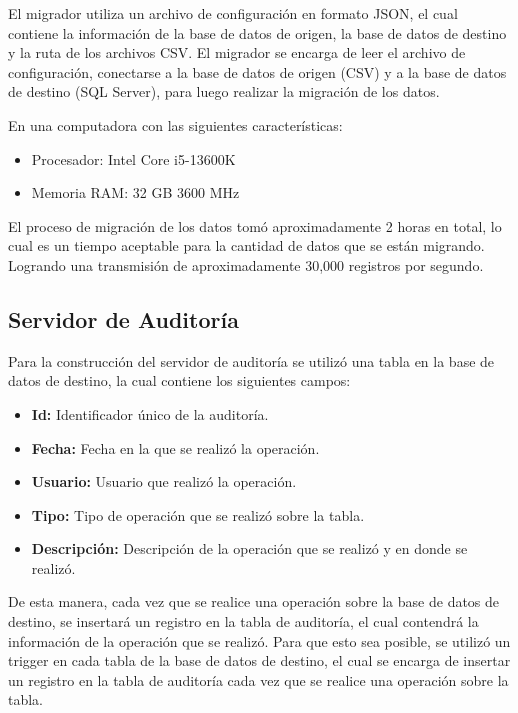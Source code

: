 El migrador utiliza un archivo de configuración en formato JSON, el cual
contiene la información de la base de datos de origen, la base de datos de 
destino y la ruta de los archivos CSV. El migrador se encarga de leer el 
archivo de configuración, conectarse a la base de datos de origen (CSV) y
a la base de datos de destino (SQL Server), para luego realizar la migración
de los datos.

En una computadora con las siguientes características:

\begin{itemize}
    \item Procesador: Intel Core i5-13600K
    \item Memoria RAM: 32 GB 3600 MHz
\end{itemize}

El proceso de migración de los datos tomó aproximadamente 2 horas 
en total, lo cual es un tiempo aceptable para la cantidad de datos que se 
están migrando. Logrando una transmisión de aproximadamente 30,000 registros
por segundo.

\subsection{Servidor de Auditoría}

Para la construcción del servidor de auditoría se utilizó una 
tabla en la base de datos de destino, la cual contiene los siguientes campos:

\begin{itemize}
    \item \textbf{Id:} Identificador único de la auditoría.
    \item \textbf{Fecha:} Fecha en la que se realizó la operación.
    \item \textbf{Usuario:} Usuario que realizó la operación.
    \item \textbf{Tipo:} Tipo de operación que se realizó sobre la tabla.
    \item \textbf{Descripción:} Descripción de la operación que se realizó y 
        en donde se realizó.
\end{itemize}

De esta manera, cada vez que se realice una operación sobre la base de datos 
de destino, se insertará un registro en la tabla de auditoría, el cual 
contendrá la información de la operación que se realizó. Para que esto 
sea posible, se utilizó un trigger en cada tabla de la base de datos de 
destino, el cual se encarga de insertar un registro en la tabla de auditoría 
cada vez que se realice una operación sobre la tabla.


